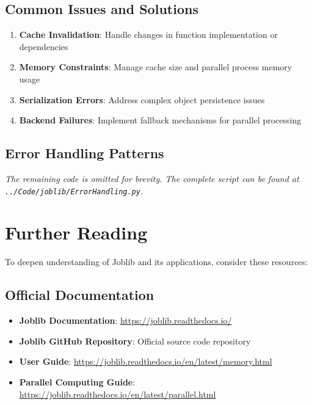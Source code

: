 \subsection{Common Issues and Solutions}
\label{subsec:common_issues}

\begin{enumerate}
	\item \textbf{Cache Invalidation}: Handle changes in function implementation or dependencies
	\item \textbf{Memory Constraints}: Manage cache size and parallel process memory usage
	\item \textbf{Serialization Errors}: Address complex object persistence issues
	\item \textbf{Backend Failures}: Implement fallback mechanisms for parallel processing
\end{enumerate}

\subsection{Error Handling Patterns}
\label{subsec:error_patterns}


\noindent\textit{The remaining code is omitted for brevity. The complete script can be found at \texttt{../Code/joblib/ErrorHandling.py}.}

\section{Further Reading}
\label{sec:further_reading}

To deepen understanding of Joblib and its applications, consider these resources:

\subsection{Official Documentation}
\begin{itemize}
	\item \textbf{Joblib Documentation}: \url{https://joblib.readthedocs.io/}
	\item \textbf{Joblib GitHub Repository}: Official source code repository \cite{Joblib:2024}
	\item \textbf{User Guide}: \url{https://joblib.readthedocs.io/en/latest/memory.html}
	\item \textbf{Parallel Computing Guide}: \url{https://joblib.readthedocs.io/en/latest/parallel.html}
\end{itemize}

